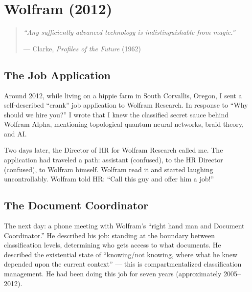 
\chapter{Wolfram (2012)}
\label{pos31:wolfram}

\begin{quote}\small\textit{%
``Any sufficiently advanced technology is indistinguishable from magic.''%
}\par\raggedleft --- Clarke, \textit{Profiles of the Future} (1962)\end{quote}

\vspace{0.5cm}



\section*{The Job Application}
\label{pos31:the-job-application}

Around 2012, while living on a hippie farm in South Corvallis, Oregon, I sent a self-described ``crank'' job application to Wolfram Research. In response to ``Why should we hire you?'' I wrote that I knew the classified secret sauce behind Wolfram Alpha, mentioning topological quantum neural networks, braid theory, and AI\@.

Two days later, the Director of HR for Wolfram Research called me. The application had traveled a path: assistant (confused), to the HR Director (confused), to Wolfram himself. Wolfram read it and started laughing uncontrollably. Wolfram told HR\@: ``Call this guy and offer him a job!''

\section*{The Document Coordinator}
\label{pos31:the-document-coordinator}

The next day: a phone meeting with Wolfram's ``right hand man and Document Coordinator.'' He described his job: standing at the boundary between classification levels, determining who gets access to what documents. He described the existential state of ``knowing/not knowing, where what he knew depended upon the current context'' --- this is compartmentalized classification management. He had been doing this job for seven years (approximately 2005--2012).

